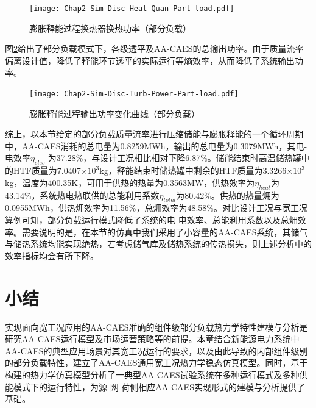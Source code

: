 \begin{figure}[H] %
  \centering
  \texttt{[image: Chap2-Sim-Disc-Heat-Quan-Part-load.pdf]}
  \caption{膨胀释能过程换热器换热功率（部分负载）}
  \label{fig:Sim-Disc-Heat-Quan-Part-load}
\end{figure}

图\ref{fig:Sim-Disc-Turb-Power-Part-load}给出了部分负载模式下，各级透平及AA-CAES的总输出功率。由于质量流率偏离设计值，降低了释能环节透平的实际运行等熵效率，从而降低了系统输出功率。

\begin{figure}[H] %
  \centering
  \texttt{[image: Chap2-Sim-Disc-Turb-Power-Part-load.pdf]}
  \caption{膨胀释能过程输出功率变化曲线（部分负载）}
  \label{fig:Sim-Disc-Turb-Power-Part-load}
\end{figure}

综上，以本节给定的部分负载质量流率进行压缩储能与膨胀释能的一个循环周期中，AA-CAES消耗的总电量为0.8259MWh，输出的总电量为0.3079MWh，其电-电效率$\eta_{elec}$ 为37.28\%，与设计工况相比相对下降6.87\%。储能结束时高温储热罐中的HTF质量为7.0407$\times10^3$kg，释能结束时储热罐中剩余的HTF质量为3.3266$\times10^3$kg，温度为400.35K，可用于供热的热量为0.3563MW，供热效率为$\eta_{heat}$为43.14\%，系统热电热联供的总能利用系数$\eta_{total}$为80.42\%。供热的热量㶲为0.0955MWh，供热㶲效率为11.56\%，总㶲效率为48.58\%。对比设计工况与宽工况算例可知，部分负载运行模式降低了系统的电-电效率、总能利用系数以及总㶲效率。需要说明的是，在本节的仿真中我们采用了小容量的AA-CAES系统，其储气与储热系统均能实现绝热，若考虑储气库及储热系统的传热损失，则上述分析中的效率指标均会有所下降。

\section{小结}
实现面向宽工况应用的AA-CAES准确的组件级部分负载热力学特性建模与分析是研究AA-CAES运行模型及市场运营策略等的前提。本章结合新能源电力系统中AA-CAES的典型应用场景对其宽工况运行的要求，以及由此导致的内部组件级别的部分负载特性，建立了AA-CAES通用宽工况热力学稳态仿真模型。同时，基于构建的热力学仿真模型分析了一典型AA-CAES试验系统在多种运行模式及多种供能模式下的运行特性，为源-网-荷侧相应AA-CAES实现形式的建模与分析提供了基础。
